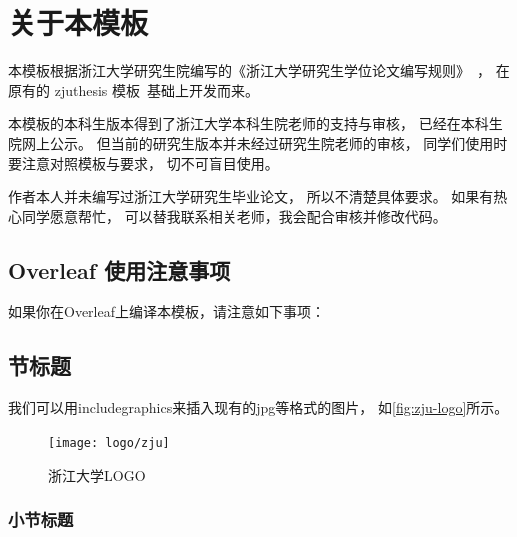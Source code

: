 \chapter{关于本模板}

本模板根据浙江大学研究生院编写的《浙江大学研究生学位论文编写规则》~\cite{zjugradthesisrules}，
在原有的 zjuthesis 模板~\cite{zjuthesis}基础上开发而来。

本模板的本科生版本\cite{zjuthesisrules}得到了浙江大学本科生院老师的支持与审核，
已经在本科生院网上公示。
但当前的研究生版本并未经过研究生院老师的审核，
同学们使用时要注意对照模板与要求，
切不可盲目使用。

作者本人并未编写过浙江大学研究生毕业论文，
所以不清楚具体要求。
如果有热心同学愿意帮忙，
可以替我联系相关老师，我会配合审核并修改代码。

\section{Overleaf 使用注意事项}

如果你在Overleaf上编译本模板，请注意如下事项：



\section{节标题}

我们可以用includegraphics来插入现有的jpg等格式的图片，
如\autoref{fig:zju-logo}所示。

\begin{figure}[htbp]
    \centering
    \texttt{[image: logo/zju]}
    \caption{\label{fig:zju-logo}浙江大学LOGO}
\end{figure}


\subsection{小节标题}


